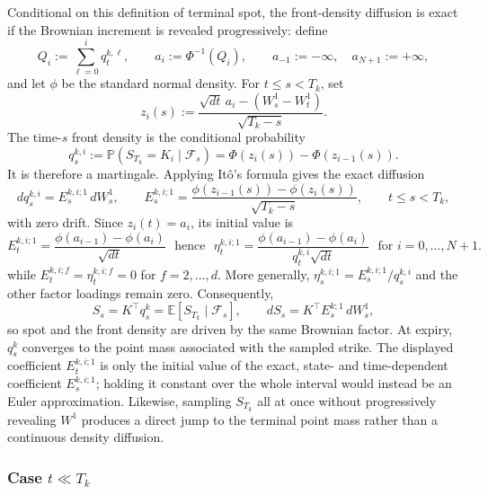 \documentclass[11pt]{article}
\theoremstyle{plain}
\theoremstyle{definition}
\theoremstyle{remark}
\begin{document}
{  Conditional on this definition of terminal spot, the front-density
  diffusion is exact if the Brownian increment is revealed progressively:
  define
  \[
    Q_i:=\sum_{\ell=0}^i q_t^{k,\ell},
    \qquad
    a_i:=\Phi^{-1}(Q_i),
    \qquad
    a_{-1}:=-\infty,\quad a_{N+1}:=+\infty,
  \]
  and let $\phi$ be the standard normal density. For $t\leq s<T_k$, set
  \[
    z_i(s):=
      \frac{\sqrt{dt}\,a_i-(W_s^1-W_t^1)}{\sqrt{T_k-s}}.
  \]
  The time-$s$ front density is the conditional probability
  \begin{equation}
    q_s^{k,i}
      :=\mathbb P\!\left(S_{T_k}=K_i\mid\mathcal F_s\right)
      =\Phi\!\left(z_i(s)\right)
       -\Phi\!\left(z_{i-1}(s)\right).
  \end{equation}
  It is therefore a martingale. Applying It\^o's formula gives the exact
  diffusion
  \begin{equation}
    dq_s^{k,i}=E_s^{k,i;1}\,dW_s^1,
    \qquad
    E_s^{k,i;1}
      =\frac{\phi(z_{i-1}(s))-\phi(z_i(s))}{\sqrt{T_k-s}},
    \qquad t\leq s<T_k,
  \end{equation}
  with zero drift. Since $z_i(t)=a_i$, its initial value is
  \begin{equation}
    E_t^{k,i;1}
      =\frac{\phi(a_{i-1})-\phi(a_i)}{\sqrt{dt}} \ \ \ \mbox{hence} \ \ \
    \eta_t^{k,i;1}
      =\frac{\phi(a_{i-1})-\phi(a_i)}{q_t^{k,i}\sqrt{dt}}
      \ \ \ \mbox{for $i=0,\ldots,N+1$.}
  \end{equation}
  while $E_t^{k,i;f}=\eta_t^{k,i;f}=0$ for $f=2,\ldots,d$.
  More generally, $\eta_s^{k,i;1}=E_s^{k,i;1}/q_s^{k,i}$ and the other
  factor loadings remain zero. Consequently,
  \[
    S_s=K^\top q_s^k
      =\mathbb E\!\left[S_{T_k}\mid\mathcal F_s\right],
    \qquad
    dS_s=K^\top E_s^{k;1}\,dW_s^1,
  \]
  so spot and the front density are driven by the same Brownian factor. At
  expiry, $q_s^k$ converges to the point mass associated with the sampled
  strike. The displayed coefficient $E_t^{k,i;1}$ is only the initial value
  of the exact, state- and time-dependent coefficient $E_s^{k,i;1}$; holding
  it constant over the whole interval would instead be an Euler
  approximation. Likewise, sampling $S_{T_k}$ all at once without
  progressively revealing $W^1$ produces a direct jump to the terminal point
  mass rather than a continuous density diffusion.






  \subsubsection*{Case $t\ll T_k$}

}
\end{document}
